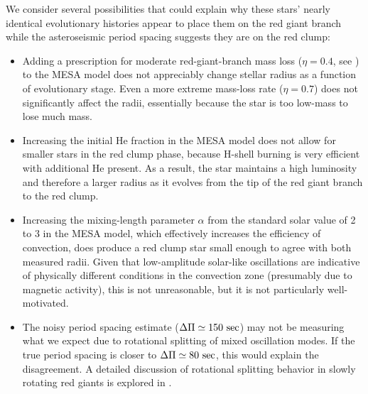 We consider several possibilities that could explain why these stars' nearly identical evolutionary histories appear to place them on the red giant branch while the asteroseismic period spacing suggests they are on the red clump:
\begin{itemize}
\item Adding a prescription for moderate red-giant-branch mass loss ($\eta = 0.4$, see \citet{mig12}) to the MESA model does not appreciably change stellar radius as a function of evolutionary stage. Even a more extreme mass-loss rate ($\eta = 0.7$) does not significantly affect the radii, essentially because the star is too low-mass to lose much mass.
\item Increasing the initial He fraction in the MESA model does not allow for smaller stars in the red clump phase, because H-shell burning is very efficient with additional He present. As a result, the star maintains a high luminosity and therefore a larger radius as it evolves from the tip of the red giant branch to the red clump.
\item Increasing the mixing-length parameter $\alpha$ from the standard solar value of 2 to 3 in the MESA model, which effectively increases the efficiency of convection, does produce a red clump star small enough to agree with both measured radii. Given that low-amplitude solar-like oscillations are indicative of physically different conditions in the convection zone (presumably due to magnetic activity), this is not unreasonable, but it is not particularly well-motivated.
\item The noisy period spacing estimate ($\Delta \Pi \simeq 150 \ \rm{sec}$) may not be measuring what we expect due to rotational splitting of mixed oscillation modes. If the true period spacing is closer to $\Delta \Pi \simeq 80 \ \rm{sec}$, this would explain the disagreement. A detailed discussion of rotational splitting behavior in slowly rotating red giants is explored in \citet{gou13}.
\end{itemize}
